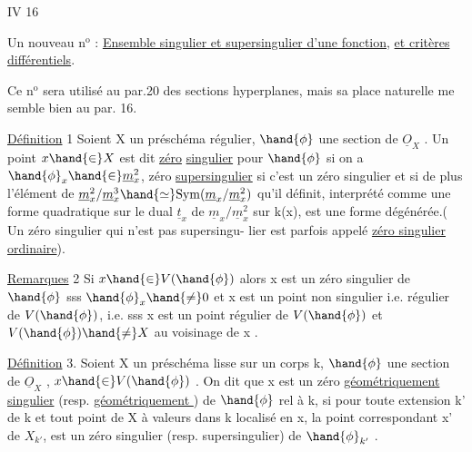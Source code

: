 
IV 16

Un nouveau n$^{\text{o}}$ : \uline{Ensemble singulier et supersingulier d'une fonction},
\uline{et critères différentiels}.

Ce n$^{\text{o}}$ sera utilisé au par.20 des sections hyperplanes, mais sa
place naturelle me semble bien au par. 16.

\uline{Définition} 1 Soient X un préschéma régulier, $\hand{\phi}$ une section de $\underline{O}_X$ . Un
point $x \hand{\in} X$ est dit \uline{zéro}  \uline{singulier} pour $\hand{\phi}$
si on a $\hand{\phi}_x \hand{\in} \underline{m}_x^2$, zéro \uline{supersingulier} si c'est un zéro singulier
et si de plus l'élément de $\underline{m}_x^2/\underline{m}_x^3 \hand{\simeq} \mathrm{Sym}(\underline{m}_x/\underline{m}_x^2)$ qu'il définit,
interprété comme une forme quadratique sur le dual $\underline{t}_x$ de $\underline{m}_x/\underline{m}_x^2$ sur k(x),
est une forme  dégénérée.( Un zéro singulier qui n'est pas supersingu-%
lier est parfois appelé \uline{zéro singulier ordinaire}).

\uline{Remarques} 2 Si $x \hand{\in} V(\hand{\phi})$\hand{,} alors x est un zéro  singulier de $\hand{\phi}$ sss
$\hand{\phi}_x \hand{\neq} 0$ et x est un point  non singulier i.e. régulier de $V(\hand{\phi})$,
i.e. sss x est un point régulier de $V(\hand{\phi})$ et $V(\hand{\phi}) \hand{\neq} X$ au voisinage de
x . 

\uline{Définition} 3. Soient X un préschéma lisse sur un corps k, $\hand{\phi}$ une
section de $\underline{O}_X$ , $x \hand{\in} V(\hand{\phi})$ . On dit que x est un zéro \uline{géométriquement}
\uline{singulier}  (resp. \uline{géométriquement } ) de $\hand{\phi}$ rel à k,
si pour toute extension k' de k et tout point \hand{$\xi$} de X à valeurs dans
k\hand{,} localisé en x, la  point correspondant x' de $X_{k'}$, est un zéro
 singulier (resp. supersingulier) de $\hand{\phi}_{k'}$ .

